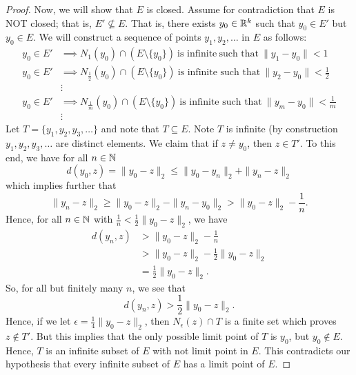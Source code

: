\documentclass[a4paper]{report}
\begin{document}
\begin{proof}
Now, we will show that \( E  \) is closed. Assume for contradiction that \( E  \) is NOT closed; that is, \( E' \not\subseteq E  \). That is, there exists \( {y}_{0} \in \mathbb{R}^{k} \) such that \( {y}_{0} \in E' \) but \( {y}_{0} \in E \). We will construct a sequence of points \( {y}_{1}, {y}_{2}, \dots  \) in \( E  \) as follows:
\begin{align*}
    {y}_{0} \in E' &\implies {N}_{1}({y}_{0}) \cap (E \setminus  \{ {y}_{0} \} ) \ \text{is infinite} \ \text{such that} \ \|{y}_{1} - {y}_{0}\| < 1  \\
    {y}_{0} \in E' &\implies {N}_{\frac{ 1 }{ 2 } }({y}_{0}) \cap (E \setminus  \{ {y}_{0} \} ) \ \text{is infinite such that} \ \| {y}_{2} - {y}_{0} \| < \frac{ 1 }{ 2 }  \\
                   &\vdots \\
    {y}_{0} \in E' &\implies {N}_{\frac{ 1 }{ m } }({y}_{0}) \cap (E \setminus  \{ {y}_{0} \} ) \ \text{is infinite such that} \ \| {y}_{m} - {y}_{0}\| < \frac{ 1 }{ m } \\
                   &\vdots
\end{align*}
Let \( T = \{ {y}_{1}, {y}_{2}, {y}_{3}, \dots  \}  \) and note that \( T \subseteq E  \). Note \( T  \) is infinite (by construction \( {y}_{1}, {y}_{2}, {y}_{3}, \dots  \) are distinct elements. We claim that if \( z \neq {y}_{0} \), then \( z \in T' \). To this end, we have for all \( n \in \mathbb{N}  \)
        \[ d({y}_{0}, z) = \|{y}_{0} - z \|_2 \leq \|{y}_{0} - {y}_{n}\|_2 + \|{y}_{n} - z \|_2 \]
        which implies further that 
        \[  \|{y}_{n} - z \|_2 \geq \|{y}_{0} - z \|_2 - \|{y}_{n} - {y}_{0}\|_2 > \|{y}_{0} - z\|_2 - \frac{ 1 }{ n }. \]
        Hence, for all \( n \in \mathbb{N}  \) with \( \frac{ 1 }{ n }  < \frac{ 1 }{ 2 }  \|{y}_{0} - z \|_2 \), we have 
        \begin{align*}
            d({y}_{n},z)&> \|{y}_{0} - z \|_2 - \frac{ 1 }{ n }  \\
                        &> \|{y}_{0} - z\|_2 - \frac{ 1 }{ 2 }  \|{y}_{0} - z \|_2 \\
                        &= \frac{ 1 }{ 2 }  \|{y}_{0} - z \|_2. 
        \end{align*}
        So, for all but finitely many \( n  \), we see that 
        \[  d({y}_{n},z) > \frac{ 1 }{ 2 }  \|{y}_{0} - z \|_2. \]
        Hence, if we let \( \epsilon = \frac{ 1 }{ 4 }  \|{y}_{0} - z\|_2 \), then \( {N}_{\epsilon}(z) \cap T  \) is a finite set which proves \( z \notin T' \). 
        But this implies that the only possible limit point of \( T  \) is \( {y}_{0} \), but \( {y}_{0} \notin E  \). Hence, \( T  \) is an infinite subset of \( E  \) with not limit point in \( E  \). This contradicts our hypothesis that every infinite subset of \( E  \) has a limit point of \( E  \).
\end{proof}
\end{document}
